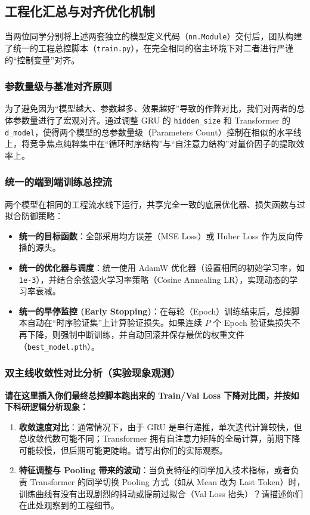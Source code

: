 \documentclass[9pt,a4paper,twoside]{rho-class/rho}
\begin{document}
    \subsection{工程化汇总与对齐优化机制}
    当两位同学分别将上述两套独立的模型定义代码（\texttt{nn.Module}）交付后，团队构建了统一的工程总控脚本（\texttt{train.py}），在完全相同的宿主环境下对二者进行严谨的“控制变量”对齐。

    \subsubsection{参数量级与基准对齐原则}
    为了避免因为“模型越大、参数越多、效果越好”导致的作弊对比，我们对两者的总体参数量进行了宏观对齐。通过调整 GRU 的 \texttt{hidden\_size} 和 Transformer 的 \texttt{d\_model}，使得两个模型的总参数量级（Parameters Count）控制在相似的水平线上，将竞争焦点纯粹集中在“循环时序结构”与“自注意力结构”对量价因子的提取效率上。

    \subsubsection{统一的端到端训练总控流}
    两个模型在相同的工程流水线下运行，共享完全一致的底层优化器、损失函数与过拟合防御策略：
    \begin{itemize}
        \item \textbf{统一的目标函数}：全部采用均方误差（MSE Loss）或 Huber Loss 作为反向传播的源头。
        \item \textbf{统一的优化器与调度}：统一使用 AdamW 优化器（设置相同的初始学习率，如 \texttt{1e-3}），并结合余弦退火学习率策略（Cosine Annealing LR），实现动态的学习率衰减。
        \item \textbf{统一的早停监控 (Early Stopping)}：在每轮（Epoch）训练结束后，总控脚本自动在“时序验证集”上计算验证损失。如果连续 $P$ 个 Epoch 验证集损失不再下降，则强制中断训练，并自动回滚并保存最优的权重文件（\texttt{best\_model.pth}）。
    \end{itemize}

    \subsubsection{双主线收敛性对比分析（实验现象观测）}
    \begin{rhoenv}[frametitle=填写建议：双主线收敛差异分析]
    \textbf{请在这里插入你们最终总控脚本跑出来的 Train/Val Loss 下降对比图，并按如下科研逻辑分析现象：}
    \begin{enumerate}
        \item \textbf{收敛速度对比}：通常情况下，由于 GRU 是串行递推，单次迭代计算较快，但总收敛代数可能不同；Transformer 拥有自注意力矩阵的全局计算，前期下降可能较慢，但后期可能更陡峭。请写出你们的实际观察。
        \item \textbf{特征调整与 Pooling 带来的波动}：当负责特征的同学加入技术指标，或者负责 Transformer 的同学切换 Pooling 方式（如从 Mean 改为 Last Token）时，训练曲线有没有出现剧烈的抖动或提前过拟合（Val Loss 抬头）？请描述你们在此处观察到的工程细节。
    \end{enumerate}
    \end{rhoenv}
\end{document}
